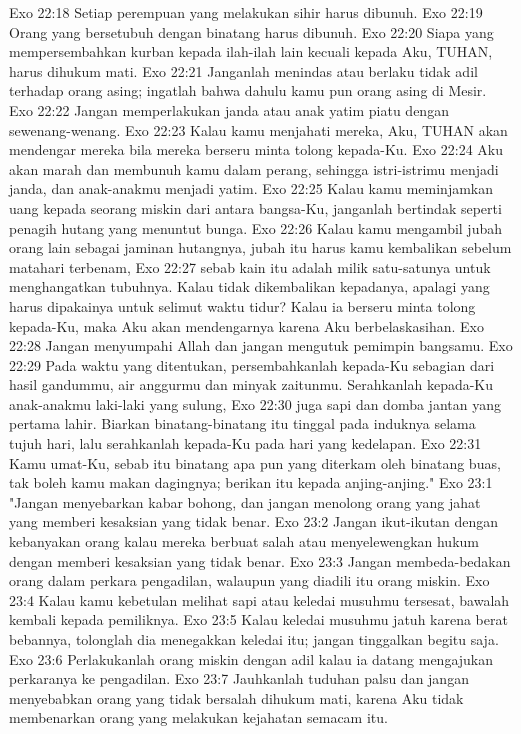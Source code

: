 Exo 22:18  Setiap perempuan yang melakukan sihir harus dibunuh.
Exo 22:19  Orang yang bersetubuh dengan binatang harus dibunuh.
Exo 22:20  Siapa yang mempersembahkan kurban kepada ilah-ilah lain kecuali kepada Aku, TUHAN, harus dihukum mati.
Exo 22:21  Janganlah menindas atau berlaku tidak adil terhadap orang asing; ingatlah bahwa dahulu kamu pun orang asing di Mesir.
Exo 22:22  Jangan memperlakukan janda atau anak yatim piatu dengan sewenang-wenang.
Exo 22:23  Kalau kamu menjahati mereka, Aku, TUHAN akan mendengar mereka bila mereka berseru minta tolong kepada-Ku.
Exo 22:24  Aku akan marah dan membunuh kamu dalam perang, sehingga istri-istrimu menjadi janda, dan anak-anakmu menjadi yatim.
Exo 22:25  Kalau kamu meminjamkan uang kepada seorang miskin dari antara bangsa-Ku, janganlah bertindak seperti penagih hutang yang menuntut bunga.
Exo 22:26  Kalau kamu mengambil jubah orang lain sebagai jaminan hutangnya, jubah itu harus kamu kembalikan sebelum matahari terbenam,
Exo 22:27  sebab kain itu adalah milik satu-satunya untuk menghangatkan tubuhnya. Kalau tidak dikembalikan kepadanya, apalagi yang harus dipakainya untuk selimut waktu tidur? Kalau ia berseru minta tolong kepada-Ku, maka Aku akan mendengarnya karena Aku berbelaskasihan.
Exo 22:28  Jangan menyumpahi Allah dan jangan mengutuk pemimpin bangsamu.
Exo 22:29  Pada waktu yang ditentukan, persembahkanlah kepada-Ku sebagian dari hasil gandummu, air anggurmu dan minyak zaitunmu. Serahkanlah kepada-Ku anak-anakmu laki-laki yang sulung,
Exo 22:30  juga sapi dan domba jantan yang pertama lahir. Biarkan binatang-binatang itu tinggal pada induknya selama tujuh hari, lalu serahkanlah kepada-Ku pada hari yang kedelapan.
Exo 22:31  Kamu umat-Ku, sebab itu binatang apa pun yang diterkam oleh binatang buas, tak boleh kamu makan dagingnya; berikan itu kepada anjing-anjing."
Exo 23:1  "Jangan menyebarkan kabar bohong, dan jangan menolong orang yang jahat yang memberi kesaksian yang tidak benar.
Exo 23:2  Jangan ikut-ikutan dengan kebanyakan orang kalau mereka berbuat salah atau menyelewengkan hukum dengan memberi kesaksian yang tidak benar.
Exo 23:3  Jangan membeda-bedakan orang dalam perkara pengadilan, walaupun yang diadili itu orang miskin.
Exo 23:4  Kalau kamu kebetulan melihat sapi atau keledai musuhmu tersesat, bawalah kembali kepada pemiliknya.
Exo 23:5  Kalau keledai musuhmu jatuh karena berat bebannya, tolonglah dia menegakkan keledai itu; jangan tinggalkan begitu saja.
Exo 23:6  Perlakukanlah orang miskin dengan adil kalau ia datang mengajukan perkaranya ke pengadilan.
Exo 23:7  Jauhkanlah tuduhan palsu dan jangan menyebabkan orang yang tidak bersalah dihukum mati, karena Aku tidak membenarkan orang yang melakukan kejahatan semacam itu.
